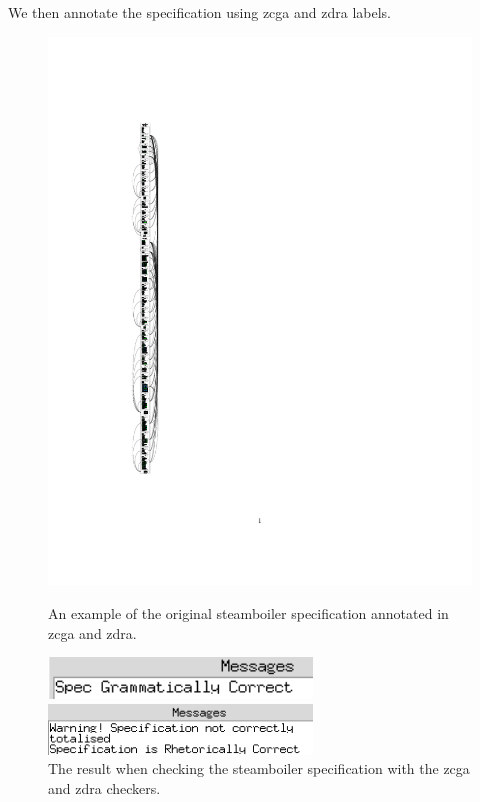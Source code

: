 We then annotate the specification using \gls{zcga} and \gls{zdra} labels.

\begin{figure}[H]
\centering
\begin{minipage}{0.45\textwidth}
\centering
\includegraphics[clip, trim=3cm 8cm 6cm 2cm]{examples/steamboiler/1n2.pdf}
\vspace{-0.18in}
\caption{An example of the original steamboiler specification annotated in \gls{zcga} and \gls{zdra}. \label{fig:steamboilert1n2}}
\vspace{-0.2in}
\end{minipage}\hfill
\begin{minipage}{0.45\textwidth}
\centering
\includegraphics[width=7cm]{examples/steamboiler/zcgacorrect.png}

\includegraphics[width=7cm]{examples/steamboiler/zdracorrect.png}

\caption{The result when checking the steamboiler specification with the \gls{zcga} and \gls{zdra} checkers. \label{fig:steamboilercorrect}}

\end{minipage}
\end{figure}

